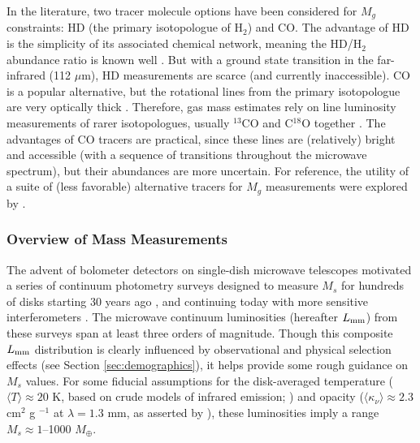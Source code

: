 \documentclass[a4paper]{ar-1col}
\begin{document}
In the literature, two tracer molecule options have been considered for $M_g$ constraints: HD (the primary isotopologue of H$_2$) and CO.  The advantage of HD is the simplicity of its associated chemical network, meaning the HD/H$_2$ abundance ratio is known well \citep{bergin13,mcclure16,trapman17}.  But with a ground state transition in the far-infrared (112 $\mu$m), HD measurements are scarce (and currently inaccessible).  CO is a popular alternative, but the rotational lines from the primary isotopologue are very optically thick \citep{beckwith93}.  Therefore, gas mass estimates rely on line luminosity measurements of rarer isotopologues, usually $^{13}$CO and C$^{18}$O together \citep{williamsbest14}.  The advantages of CO tracers are practical, since these lines are (relatively) bright and accessible (with a sequence of transitions throughout the microwave spectrum), but their abundances are more uncertain.  For reference, the utility of a suite of (less favorable) alternative tracers for $M_g$ measurements were explored by \citet{molyarova17}.


\subsubsection{Overview of Mass Measurements}
The advent of bolometer detectors on single-dish microwave telescopes motivated a series of continuum photometry surveys designed to measure $M_s$ for hundreds of disks starting 30 years ago \citep{weintraub89,beckwith90,andre94,osterloh95,aw05,aw07b}, and continuing today with more sensitive interferometers \citep[e.g.,][]{andrews13,ansdell16,cieza19}.  The microwave continuum luminosities (hereafter $L_{\rm mm}$) from these surveys span at least three orders of magnitude.  Though this composite $L_{\rm mm}$ distribution is clearly influenced by observational and physical selection effects (see Section \ref{sec:demographics}), it helps provide some rough guidance on $M_s$ values.  For some fiducial assumptions for the disk-averaged temperature ($\langle T \rangle \approx 20$ K, based on crude models of infrared emission; \citealt{aw05}) and opacity ($\langle \kappa_\nu \rangle \approx 2.3$ cm$^2$ g $^{-1}$ at $\lambda = 1.3$ mm, as asserted by \citealt{beckwith90}), these luminosities imply a range $M_s \approx 1$--1000 $M_\oplus$.
\end{document}
